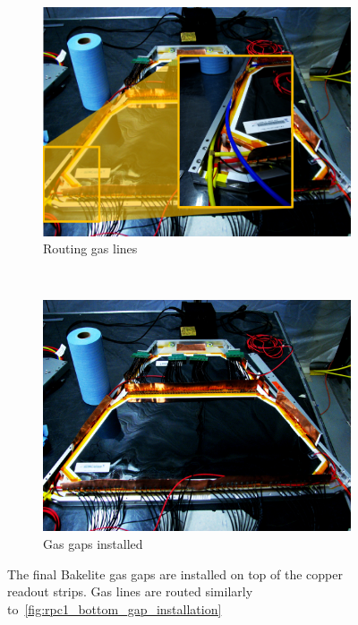 \begin{figure}
  \centering
  \begin{subfigure}[b]{0.5\textwidth}
    \centering
    \includegraphics[width=\linewidth]{./figures/rpc1_construction_6b.jpg}
    \caption{Routing gas lines}
    \label{fig:rpc1_top_gas_line_detail}
  \end{subfigure}%
  ~
  \begin{subfigure}[b]{0.5\textwidth}
    \centering
    \includegraphics[width=\linewidth]{./figures/rpc1_construction_6}
    \caption{Gas gaps installed}
    \label{fig:rpc1_top_gap_installed}
  \end{subfigure}
  \caption{
    The final Bakelite gas gaps are installed on top of the copper readout
    strips. Gas lines are routed similarly to~\ref{fig:rpc1_bottom_gap_installation}
  }
  \label{fig:rpc1_top_gap_installation}
\end{figure}

